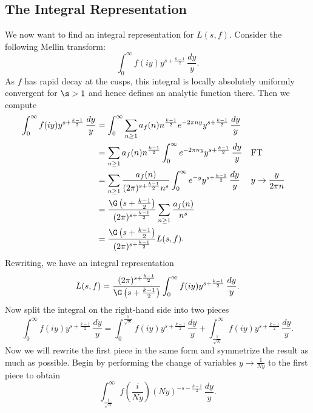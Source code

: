     \subsection*{The Integral Representation}
      We now want to find an integral representation for $L(s,f)$. Consider the following Mellin transform:
      \[
        \int_{0}^{\infty}f(iy)y^{s+\frac{k-1}{2}}\,\frac{dy}{y}.
      \]
      As $f$ has rapid decay at the cusps, this integral is locally absolutely uniformly convergent for $\s > 1$ and hence defines an analytic function there. Then we compute
      \begin{align*}
        \int_{0}^{\infty}f(iy)y^{s+\frac{k-1}{2}}\,\frac{dy}{y} &= \int_{0}^{\infty}\sum_{n \ge 1}a_{f}(n)n^{\frac{k-1}{2}}e^{-2\pi ny}y^{s+\frac{k-1}{2}}\,\frac{dy}{y} \\
        &= \sum_{n \ge 1}a_{f}(n)n^{\frac{k-1}{2}}\int_{0}^{\infty}e^{-2\pi ny}y^{s+\frac{k-1}{2}}\,\frac{dy}{y} &&\text{FT} \\
        &= \sum_{n \ge 1}\frac{a_{f}(n)}{(2\pi)^{s+\frac{k-1}{2}}n^{s}}\int_{0}^{\infty}e^{-y}y^{s+\frac{k-1}{2}}\,\frac{dy}{y} &&\text{$y \to \frac{y}{2\pi n}$} \\
        &= \frac{\G\left(s+\frac{k-1}{2}\right)}{(2\pi)^{s+\frac{k-1}{2}}}\sum_{n \ge 1}\frac{a_{f}(n)}{n^{s}} \\
        &= \frac{\G\left(s+\frac{k-1}{2}\right)}{(2\pi)^{s+\frac{k-1}{2}}}L(s,f).
      \end{align*}
      Rewriting, we have an integral representation
      \begin{equation}\label{equ:integral_representation_holomorphic_1}
        L(s,f) = \frac{(2\pi)^{s+\frac{k-1}{2}}}{\G\left(s+\frac{k-1}{2}\right)}\int_{0}^{\infty}f(iy)y^{s+\frac{k-1}{2}}\,\frac{dy}{y}.
      \end{equation}
      Now split the integral on the right-hand side into two pieces
      \begin{equation}\label{equ:symmetric_integral_holomorphic_split}
        \int_{0}^{\infty}f(iy)y^{s+\frac{k-1}{2}}\,\frac{dy}{y} = \int_{0}^{\frac{1}{\sqrt{N}}}f(iy)y^{s+\frac{k-1}{2}}\,\frac{dy}{y}+\int_{\frac{1}{\sqrt{N}}}^{\infty}f(iy)y^{s+\frac{k-1}{2}}\,\frac{dy}{y}.
      \end{equation}
      Now we will rewrite the first piece in the same form and symmetrize the result as much as possible. Begin by performing the change of variables $y \to \frac{1}{Ny}$ to the first piece to obtain
      \[
        \int_{\frac{1}{\sqrt{N}}}^{\infty}f\left(\frac{i}{Ny}\right)(Ny)^{-s-\frac{k-1}{2}}\,\frac{dy}{y}.
      \]

